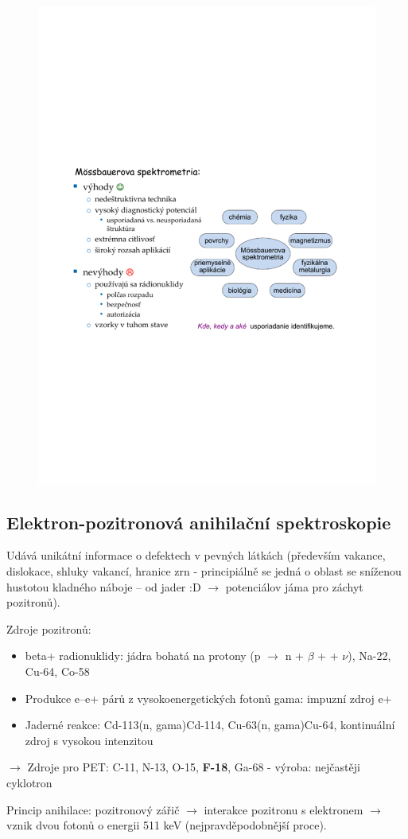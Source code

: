 \begin{figure}[H]
   \centering
   \includegraphics[width=0.5\linewidth, trim={2cm 10cm 2cm 10cm}, clip]{img/mossbauer_shrnuti.pdf}
\end{figure}

\subsection{Elektron-pozitronová anihilační spektroskopie}

Udává unikátní informace o defektech v pevných látkách (především vakance, dislokace, shluky vakancí, hranice zrn - principiálně se jedná o oblast se sníženou hustotou kladného náboje -- od jader :D $\rightarrow$ potenciálov jáma pro záchyt pozitronů).

Zdroje pozitronů:

\begin{itemize}
	\item beta+ radionuklidy: jádra bohatá na protony (p $\rightarrow$ n + $\beta$ + + $\nu$), Na-22, Cu-64, Co-58
	\item Produkce e--e+ párů z vysokoenergetických fotonů gama: impuzní zdroj e+
	\item Jaderné reakce: Cd-113(n, gama)Cd-114, Cu-63(n, gama)Cu-64, kontinuální zdroj s vysokou intenzitou
\end{itemize}

$\rightarrow$ Zdroje pro PET: C-11, N-13, O-15, \textbf{F-18}, Ga-68 - výroba: nejčastěji cyklotron

Princip anihilace: pozitronový zářič $\rightarrow$ interakce pozitronu s elektronem $\rightarrow$ vznik dvou fotonů o energii 511 keV (nejpravděpodobnější proce).

